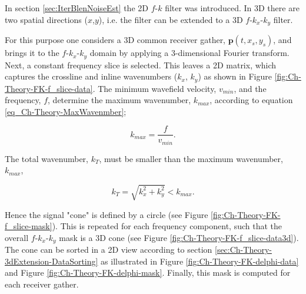 In section \ref{sec:IterBlenNoiseEst} the 2D $f$-$k$ filter was introduced. In 3D there are two spatial directions ($x$,$y$), i.e. the filter can be extended to a 3D $f$-$k_x$-$k_y$ filter.

For this purpose one considers a 3D common receiver gather, $\mathbf{p}(t,x_s,y_s)$, and brings it to the $f$-$k_x$-$k_y$ domain by applying a 3-dimensional Fourier transform. Next, a constant frequency slice is selected. This leaves a 2D matrix, which captures the crossline and inline wavenumbers ($k_x$, $k_y$) as shown in Figure \ref{fig:Ch-Theory-FK-f_slice-data}. The minimum wavefield velocity, $v_{min}$, and the frequency, $f$, determine the maximum wavenumber, $k_{max}$, according to equation \ref{eq_Ch-Theory-MaxWavenmber};

\begin{equation}
	k_{max} = \frac{f}{v_{min}}.
	\label{eq_Ch-Theory-MaxWavenmber-Repetition}
\end{equation} 

The total wavenumber, $k_{T}$, must be smaller than the maximum wavenumber, $k_{max}$,

\begin{equation}
	k_{T} = \sqrt{k_x^2 + k_{y}^2} < k_{max}.
	\label{eq:Ch-Theory-TotalWavenumber}
\end{equation}

Hence the signal "cone" is defined by a circle (see Figure \ref{fig:Ch-Theory-FK-f_slice-mask}). This is repeated for each frequency component, such that the overall $f$-$k_x$-$k_y$ mask is a 3D cone (see Figure \ref{fig:Ch-Theory-FK-f_slice-data3d}). The cone can be sorted in a 2D view according to section \ref{sec:Ch-Theory-3dExtension-DataSorting} as illustrated in Figure \ref{fig:Ch-Theory-FK-delphi-data} and Figure \ref{fig:Ch-Theory-FK-delphi-mask}. Finally, this mask is computed for each receiver gather.







